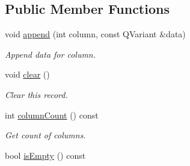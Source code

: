 \subsection*{Public Member Functions}
\begin{DoxyCompactItemize}
\item 
void \hyperlink{class_mdt_1_1_item_model_1_1_key_record_a280720e149d0fa7d8cb22efbdd4fef17}{append} (int column, const Q\+Variant \&data)
\begin{DoxyCompactList}\small\item\em Append data for column. \end{DoxyCompactList}\item 
void \hyperlink{class_mdt_1_1_item_model_1_1_key_record_a8fd9bdeca847ee27d48455cde9d44e89}{clear} ()\hypertarget{class_mdt_1_1_item_model_1_1_key_record_a8fd9bdeca847ee27d48455cde9d44e89}{}\label{class_mdt_1_1_item_model_1_1_key_record_a8fd9bdeca847ee27d48455cde9d44e89}

\begin{DoxyCompactList}\small\item\em Clear this record. \end{DoxyCompactList}\item 
int \hyperlink{class_mdt_1_1_item_model_1_1_key_record_ae71ebeb73adcfa0803003b2246980e2e}{column\+Count} () const \hypertarget{class_mdt_1_1_item_model_1_1_key_record_ae71ebeb73adcfa0803003b2246980e2e}{}\label{class_mdt_1_1_item_model_1_1_key_record_ae71ebeb73adcfa0803003b2246980e2e}

\begin{DoxyCompactList}\small\item\em Get count of columns. \end{DoxyCompactList}\item 
bool \hyperlink{class_mdt_1_1_item_model_1_1_key_record_ab2fb89a42c76df693a82797f6924b79e}{is\+Empty} () const \hypertarget{class_mdt_1_1_item_model_1_1_key_record_ab2fb89a42c76df693a82797f6924b79e}{}\label{class_mdt_1_1_item_model_1_1_key_record_ab2fb89a42c76df693a82797f6924b79e}


\end{DoxyCompactItemize}
